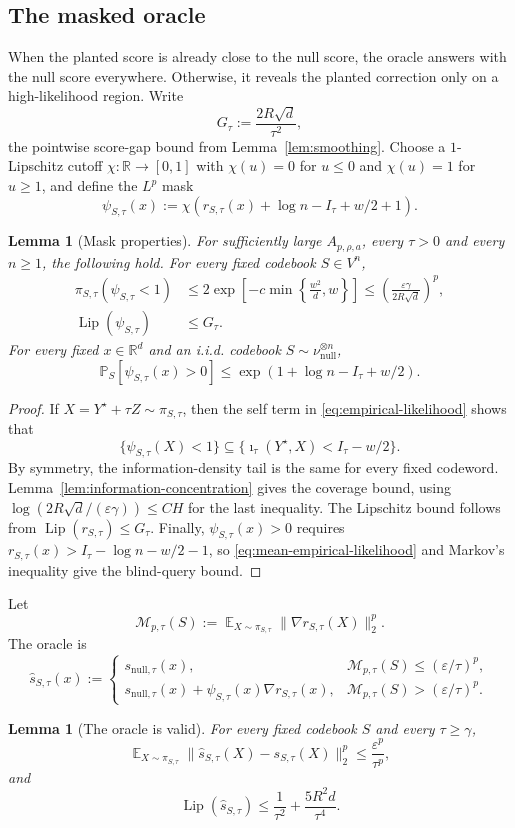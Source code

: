 \documentclass[11pt,letterpaper]{article}
\newtheorem{lemma}[theorem]{Lemma}
\newcommand{\R}{\mathbb{R}}
\DeclareMathOperator*{\E}{\mathbb{E}}
\newcommand{\eps}{\varepsilon}
\newcommand{\1}{\mathbbm{1}}
\DeclareMathOperator{\Lip}{Lip}
\newcommand{\Prob}{\mathbb P}
\begin{document}
\subsection{The masked oracle}
\label{sec:noise-translation}
When the planted score is already close to the null score, the oracle answers
with the null score everywhere.  Otherwise, it reveals the planted
correction only on a high-likelihood region.  Write
\[
   G_\tau:=\frac{2R\sqrt d}{\tau^2},
\]
the pointwise score-gap bound from Lemma~\ref{lem:smoothing}.  Choose a
\(1\)-Lipschitz cutoff
\(\chi:\R\to[0,1]\) with \(\chi(u)=0\) for \(u\le0\) and
\(\chi(u)=1\) for \(u\ge1\), and define the \(L^p\) mask
\[
   \psi_{S,\tau}(x)
   :=\chi\left(r_{S,\tau}(x)+\log n-I_\tau+w/2+1\right).
\]

\begin{lemma}[Mask properties]\label{lem:mask-properties}
For sufficiently large \(A_{p,\rho,a}\), every \(\tau>0\) and
every \(n\ge1\), the following hold.
For every fixed codebook \(S\in V^n\),
\[
\begin{aligned}
   \pi_{S,\tau}(\psi_{S,\tau}<1)
   &\le2\exp\left[-c\min\left\{\frac{w^2}{d},w\right\}\right]
    \le\left(\frac{\eps\gamma}{2R\sqrt d}\right)^p,\\
   \Lip(\psi_{S,\tau})&\le G_\tau.
\end{aligned}
\]
For every fixed \(x\in\R^d\) and an i.i.d. codebook
\(S\sim\nu_{\mathrm{null}}^{\otimes n}\),
\[
   \Prob_S[\psi_{S,\tau}(x)>0]
   \le\exp(1+\log n-I_\tau+w/2).
\]
\end{lemma}

\begin{proof}
If \(X=Y^\star+\tau Z\sim\pi_{S,\tau}\), then the self term in
\eqref{eq:empirical-likelihood} shows that
\[
   \{\psi_{S,\tau}(X)<1\}
   \subseteq
   \{\imath_\tau(Y^\star,X)<I_\tau-w/2\}.
\]
By symmetry, the information-density tail is the same for every fixed
codeword.  Lemma~\ref{lem:information-concentration} gives the coverage
bound, using \(\log(2R\sqrt d/(\eps\gamma))\le C H\) for the last
inequality.  The Lipschitz bound follows from
\(\Lip(r_{S,\tau})\le G_\tau\).
Finally, \(\psi_{S,\tau}(x)>0\) requires
\(r_{S,\tau}(x)>I_\tau-\log n-w/2-1\), so
\eqref{eq:mean-empirical-likelihood} and Markov's inequality give the
blind-query bound.
\end{proof}

Let
\[
   \mathcal M_{p,\tau}(S)
   :=\E_{X\sim\pi_{S,\tau}}
      \|\nabla r_{S,\tau}(X)\|_2^p.
\]
The oracle is
\[
   \widehat s_{S,\tau}(x):=
   \begin{cases}
      s_{\mathrm{null},\tau}(x),
      & \mathcal M_{p,\tau}(S)\le(\eps/\tau)^p,\\[1mm]
      s_{\mathrm{null},\tau}(x)
      +\psi_{S,\tau}(x)\nabla r_{S,\tau}(x),
      & \mathcal M_{p,\tau}(S)>(\eps/\tau)^p.
   \end{cases}
\]
\begin{lemma}[The oracle is valid]\label{lem:oracle-valid}
For every fixed codebook \(S\) and every \(\tau\ge\gamma\),
\[
   \E_{X\sim\pi_{S,\tau}}
   \|\widehat s_{S,\tau}(X)-s_{S,\tau}(X)\|_2^p
   \le\frac{\eps^p}{\tau^p},
\]
and
\[
   \Lip(\widehat s_{S,\tau})
   \le\frac1{\tau^2}+\frac{5R^2d}{\tau^4}.
\]
\end{lemma}
\end{document}
